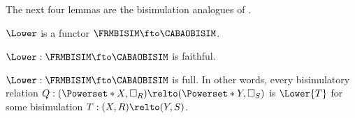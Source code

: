 The next four lemmas are the bisimulation analogues of
.

\begin{lemma}
  \(\Lower\) is a functor \(\FRMBISIM \fto \CABAOBISIM\).
\end{lemma}

\begin{lemma}
  \(\Lower : \FRMBISIM \fto \CABAOBISIM\) is faithful.
\end{lemma}

\begin{lemma}\label{lem:lower-CABAOBISIM-full}
  \(\Lower : \FRMBISIM \fto \CABAOBISIM\) is full. In other words, every
  bisimulatory relation \(Q : (\Powerset*{X}, \Box_R) \relto (\Powerset*{Y},
  \Box_S)\) is \(\Lower{T}\) for some bisimulation \(T : (X, R) \relto (Y,
  S)\).
\end{lemma}


